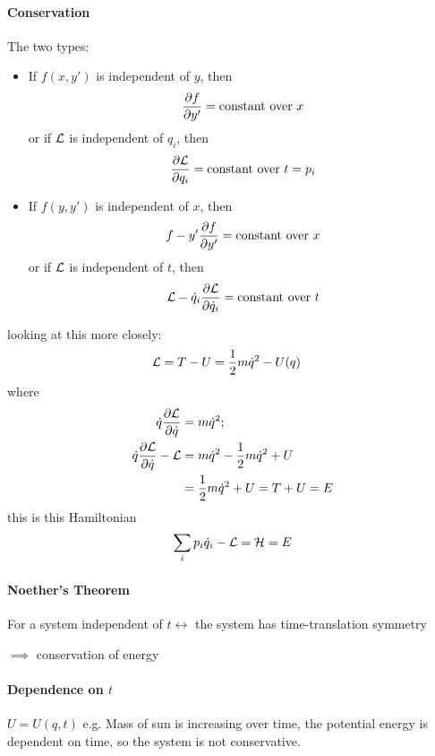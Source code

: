 \documentclass[../main.tex]{subfiles}
\begin{document}
\paragraph*{Conservation} The two types: 
\begin{itemize}
    \item If $f(x, y')$ is independent of $y$, then
    \begin{align*}
        \pdv{f}{y'} = \text{constant over } x
    \end{align*}
    or if $\mathcal{L}$ is independent of $q_i$, then
    \begin{align*}
        \pdv{\mathcal{L}}{q_i} = \text{constant over } t = p_i
    \end{align*}
    \item If $f(y, y')$ is independent of $x$, then
    \begin{align*}
        f - y' \pdv{f}{y'} = \text{constant over } x
    \end{align*}
    or if $\mathcal{L}$ is independent of $t$, then
    \begin{align*}
        \mathcal{L} - \dot q_i \pdv{\mathcal{L}}{\dot q_i} = \text{constant over } t
    \end{align*}
\end{itemize}
looking at this more closely:
    \begin{align*}
        \mathcal{L} &= T - U = \frac{1}{2} m \dot q^2 - U(q)
    \end{align*}
    where
    \begin{align*}
        \dot q \pdv{\mathcal{L}}{\dot q} &= m \dot q^2; \\
        \dot q \pdv{\mathcal{L}}{\dot q} - \mathcal{L} &= m \dot q^2 - \frac{1}{2} m \dot q^2 + U \\
        &= \frac{1}{2} m \dot q^2 + U = T + U = E
    \end{align*}
    this is this Hamiltonian 
    \begin{align*}
        \sum_i p_i \dot q_i - \mathcal{L} = \mathcal H = E
    \end{align*}
\paragraph*{Noether's Theorem} For a system independent of $t \leftrightarrow$ the system has
time-translation symmetry

$\implies$ conservation of energy

\paragraph*{Dependence on $t$} $U = U(q, t)$ e.g. Mass of sun is increasing over time, the potential
energy is dependent on time, so the system is not conservative. 
\end{document}

